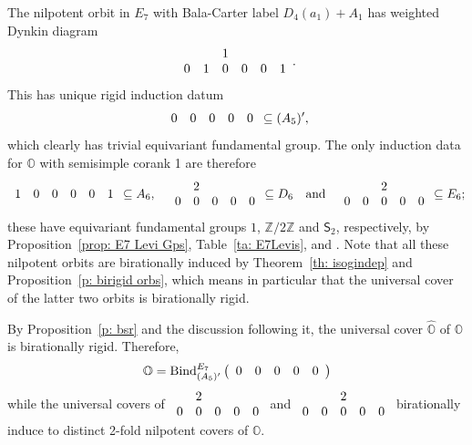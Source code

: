 \documentclass[11pt]{amsart}
\renewcommand{\O}{{\mathbb O}}
\newcommand{\bZ}{{\mathbb Z}}
\newcommand{\Sym}{{\mathsf{S}}}
\newcommand{\BInd}{{{\mbox{\rm Bind}}}}
\newcommand{\hatO}{\widehat{\O}}
\numberwithin{equation}{section}
\begin{document}
	The nilpotent orbit in $E_7$ with Bala-Carter label $D_4(a_1)+A_1$ has weighted Dynkin diagram
	$$\begin{array}{c c c c c c}
		& & 1 & & & \\
		0 & 1 & 0 & 0 & 0 & 1 \\
	\end{array}.$$ This has unique rigid induction datum $$\begin{array}{c c c c c}
		0 & 0 & 0 & 0 & 0  \\
	\end{array}\subseteq (A_5)',$$ which clearly has trivial equivariant fundamental group. The only induction data for $\O$ with semisimple corank 1 are therefore
	$$\begin{array}{c c c c c c}
		1 & 0 & 0 & 0 & 0 & 1 \\
	\end{array}\subseteq A_6, \quad \begin{array}{c c c c c}
	& 2 &  & & \\
	0 & 0 & 0 & 0 & 0  \\
	\end{array} \subseteq D_6\quad \mbox{and}\quad \begin{array}{c c c c c}
		& & 2 & & \\
		0 & 0 & 0 & 0 & 0  \\
	\end{array} \subseteq E_6;$$ these have equivariant fundamental groups $1$, $\bZ/2\bZ$ and $\Sym_2$, respectively, by Proposition~\ref{prop: E7 Levi Gps}, Table~\ref{ta: E7Levis}, and \cite[\S 8.4]{CM}. Note that all these nilpotent orbits are birationally induced by Theorem~\ref{th: isogindep} and Proposition~\ref{p: birigid orbs}, which means in particular that the universal cover of the latter two orbits is birationally rigid.
	
	By Proposition~\ref{p: bsr} and the discussion following it, the universal cover $\hatO$ of $\O$ is birationally rigid. Therefore, $$\O=\BInd_{(A_5)'}^{E_7}\left(\begin{array}{c c c c c}
		0 & 0 & 0 & 0 & 0  \\
	\end{array}\right)$$ while the universal covers of $\begin{array}{c c c c c}
	& 2 &  & & \\
	0 & 0 & 0 & 0 & 0  \\
	\end{array}$ and $\begin{array}{c c c c c}
		& & 2 & & \\
		0 & 0 & 0 & 0 & 0  \\
	\end{array}$ birationally induce to distinct 2-fold nilpotent covers of $\O$.
	
\end{document}
